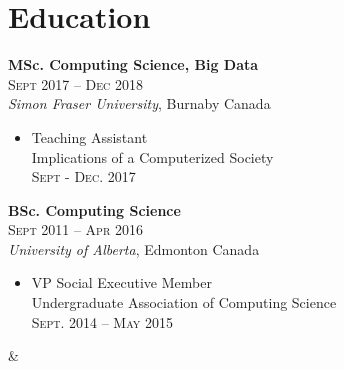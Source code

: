 \documentclass[10pt]{article} %
\begin{document}
\begin{minipage}[t]{0.43\textwidth}

%



\section{Education} 


\textbf{MSc. Computing Science, Big Data} \\ \textsc{Sept 2017 -- Dec 2018}\\ 
\textit{Simon Fraser University}, Burnaby Canada
\begin{itemize}
    \item  Teaching Assistant \\ 
         Implications of a Computerized Society \\
    \textsc{Sept - Dec. 2017}

\end{itemize}

\textbf{BSc. Computing Science} \\ \textsc{Sept 2011 -- Apr 2016} \\
\textit{University of Alberta}, Edmonton Canada
\begin{itemize}
    \item  VP Social Executive Member\\Undergraduate Association of Computing Science \\ 
    \textsc{Sept. 2014 -- May 2015}
\end{itemize}
&\\


 
\end{minipage} %
\end{document}
